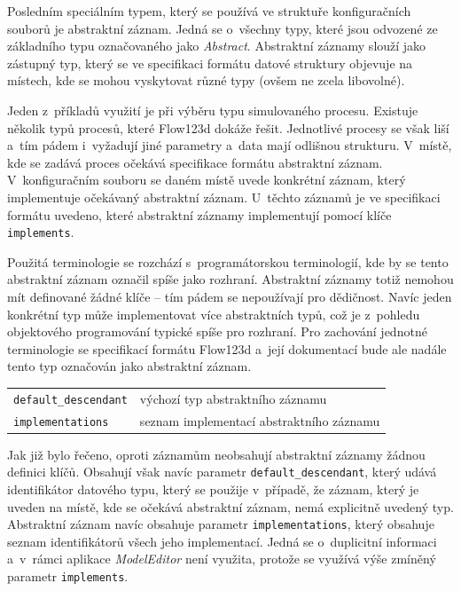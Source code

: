 \documentclass[FM,bw,DP]{tulthesis}
\begin{document}
Posledním speciálním typem, který se používá ve struktuře konfiguračních souborů je abstraktní záznam. Jedná se o~všechny typy, které jsou odvozené ze základního typu označovaného jako \textit{Abstract}. Abstraktní záznamy slouží jako zástupný typ, který se ve specifikaci formátu datové struktury objevuje na místech, kde se mohou vyskytovat různé typy (ovšem ne zcela libovolné).


Jeden z~příkladů využití je při výběru typu simulovaného procesu. Existuje několik typů procesů, které Flow123d dokáže řešit. Jednotlivé procesy se však liší a~tím pádem i~vyžadují jiné parametry a~data mají odlišnou strukturu.
V~místě, kde se zadává proces očekává specifikace formátu abstraktní záznam.
V~konfiguračním souboru se daném místě uvede konkrétní záznam, který implementuje očekávaný abstraktní záznam. U~těchto záznamů je ve specifikaci formátu uvedeno, které abstraktní záznamy implementují pomocí klíče \texttt{implements}.


Použitá terminologie se rozchází s~programátorskou terminologií, kde by se tento abstraktní záznam označil spíše jako rozhraní. Abstraktní záznamy totiž nemohou mít definované žádné klíče -- tím pádem se nepoužívají pro dědičnost. Navíc jeden konkrétní typ může implementovat více abstraktních typů, což je z~pohledu objektového programování typické spíše pro rozhraní. Pro zachování jednotné terminologie se specifikací formátu Flow123d a~její dokumentací bude ale nadále tento typ označován jako abstraktní záznam.

\vspace{0.5cm}
\begin{tabular}{m{5cm}@{}l}
\texttt{default\_descendant}\dotfill & výchozí typ abstraktního záznamu \\
\texttt{implementations}\dotfill & seznam implementací abstraktního záznamu \\
\end{tabular}
\vspace{0.5cm}

Jak již bylo řečeno, oproti záznamům neobsahují abstraktní záznamy žádnou definici klíčů. Obsahují však navíc parametr \texttt{default\_descendant}, který udává identifikátor datového typu, který se použije v~případě, že záznam, který je uveden na místě, kde se očekává abstraktní záznam, nemá explicitně uvedený typ. Abstraktní záznam navíc obsahuje parametr \texttt{implementations}, který obsahuje seznam identifikátorů všech jeho implementací. Jedná se o~duplicitní informaci a~v~rámci aplikace \textit{ModelEditor} není využita, protože se využívá výše zmíněný parametr \texttt{implements}.
\end{document}
